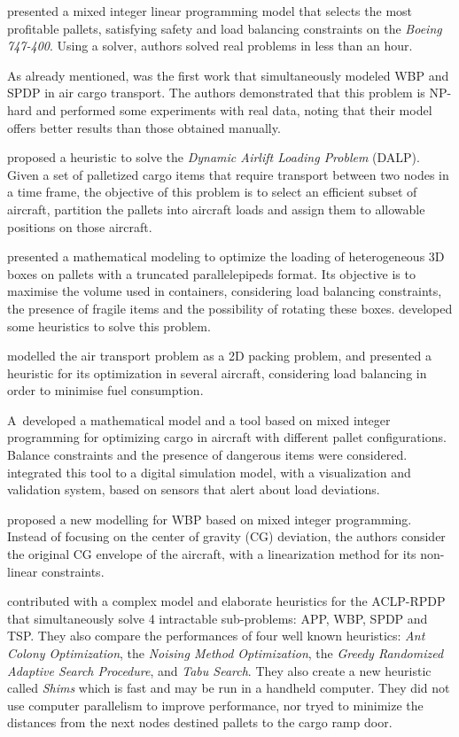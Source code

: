 \documentclass[preprint,authoryear]{elsarticle}
\begin{document}
\cite{Vancroonemburg2014} presented a mixed integer linear programming model that selects the most profitable pallets, satisfying safety and load balancing constraints on the {\it Boeing 747-400}. Using a solver, authors solved real problems in less than an hour.

As already mentioned, \cite{LurkinSchyns2015} was the first work that simultaneously modeled WBP and SPDP in air cargo transport. The authors demonstrated that this problem is NP-hard and performed some experiments with real data, noting that their model offers better results than those obtained manually.

\cite{RoesenerBarnes2016} proposed a heuristic to solve the {\it Dynamic Airlift Loading Problem} (DALP). Given a set of palletized cargo items that require transport between two nodes in a time frame, the objective of this problem is to select an efficient subset of aircraft, partition the pallets into aircraft loads and assign them to allowable positions on those aircraft.

\cite{PaquaySchynsLimbourg2016} presented a mathematical modeling to optimize the loading of heterogeneous 3D boxes on pallets with a truncated parallelepipeds format. Its objective is to maximise the volume used in containers, considering load balancing constraints, the presence of fragile items and the possibility of rotating these boxes. \cite{PaquayLimbourgSchynsOliveira2018} developed some heuristics to solve this problem.

\cite{YangLiuGao2018} modelled the air transport problem as a 2D packing problem, and presented a heuristic for its optimization in several aircraft, considering load balancing in order to minimise fuel consumption.

\cite{wong2020}A developed a mathematical model and a tool based on mixed integer programming for optimizing cargo in aircraft with different pallet configurations. Balance constraints and the presence of dangerous items were considered. \cite{eugene2021} integrated this tool to a digital simulation model, with a visualization and validation system, based on sensors that alert about load deviations.

\cite{zhao2021} proposed a new modelling for WBP based on mixed integer programming. Instead of focusing on the center of gravity (CG) deviation, the authors consider the original CG envelope of the aircraft, with a linearization method for its non-linear constraints.

\cite{MesquitaSanches2023} contributed with a complex model and elaborate heuristics for the ACLP-RPDP that simultaneously solve 4 intractable sub-problems: APP, WBP, SPDP and TSP. They also compare the performances of four well known heuristics: {\it Ant Colony Optimization}, the {\it Noising Method Optimization}, the {\it Greedy Randomized Adaptive Search Procedure}, and {\it Tabu Search}. They also create a new heuristic called {\it Shims} which is fast and may be run in a handheld computer. They did not use computer parallelism to improve performance, nor tryed to minimize the distances from the next nodes destined pallets to the cargo ramp door.
\end{document}

